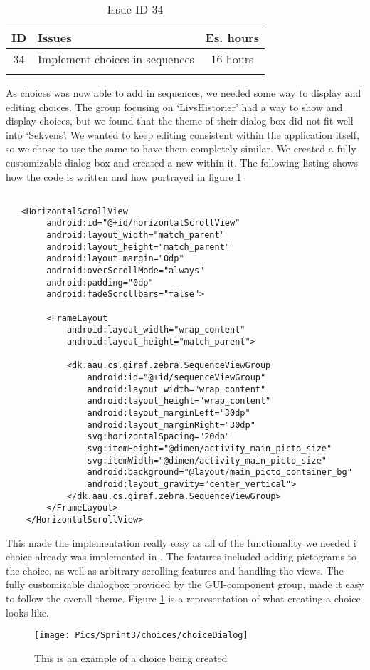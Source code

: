 \begin{longtable} { | c | p{12cm} | c | } 
\hline
	ID 	&	Issues	&		 Es. hours \\\hline
	34 	&	Implement choices in sequences	&	16 hours \\\hline
\caption{Issue ID 34}
\label{tab:spr3_choicesinsequences}
\end{longtable}

As choices was now able to add in sequences, we needed some way to display and editing choices. The group focusing on `LivsHistorier' had a way to show and display choices, but we found that the theme of their dialog box did not fit well into `Sekvens'. We wanted to keep editing consistent within the application itself, so we chose to use the same  to have them completely similar. We created a fully customizable dialog box and created a new  within it. The following listing shows how the code is written and how portrayed in figure \ref{fig:choiceDialog}

\begin{lstlisting}

   <HorizontalScrollView
        android:id="@+id/horizontalScrollView"
        android:layout_width="match_parent"
        android:layout_height="match_parent"
        android:layout_margin="0dp"
        android:overScrollMode="always"
        android:padding="0dp"
        android:fadeScrollbars="false">

        <FrameLayout
            android:layout_width="wrap_content"
            android:layout_height="match_parent">

            <dk.aau.cs.giraf.zebra.SequenceViewGroup
                android:id="@+id/sequenceViewGroup"
                android:layout_width="wrap_content"
                android:layout_height="wrap_content"
                android:layout_marginLeft="30dp"
                android:layout_marginRight="30dp"
                svg:horizontalSpacing="20dp"
                svg:itemHeight="@dimen/activity_main_picto_size"
                svg:itemWidth="@dimen/activity_main_picto_size"
                android:background="@layout/main_picto_container_bg"
                android:layout_gravity="center_vertical">
            </dk.aau.cs.giraf.zebra.SequenceViewGroup>
        </FrameLayout>
    </HorizontalScrollView>

\end{lstlisting}

This made the implementation really easy as all of the functionality we needed i choice already was implemented in . The features included adding pictograms to the choice, as well as arbitrary scrolling features and handling the views. The fully customizable dialogbox provided by the GUI-component group, made it easy to follow the overall theme. Figure \ref{fig:choiceDialog} is a representation of what creating a choice looks like.

\begin{figure} [ht!]
\centering
\texttt{[image: Pics/Sprint3/choices/choiceDialog]}
\caption{This is an example of a choice being created}
\label{fig:choiceDialog}
\end{figure}
